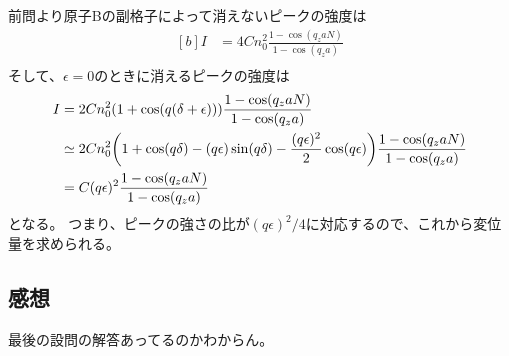 \documentclass[../../sp_2017.tex]{subfiles}
\begin{document}
\subsection{}
前問より原子Bの副格子によって消えないピークの強度は
\begin{equation}\begin{aligned}[b]
    I &=4Cn_0^2\frac{1-\cos(q_zaN)}{1-\cos(q_za)}\\
\end{aligned}\end{equation}
そして、\(\epsilon=0\)のときに消えるピークの強度は
\begin{equation}\begin{aligned}[b]
    I &=2Cn_0^2(1+\cos(q(\delta+\epsilon)))\frac{1-\cos(q_zaN)}{1-\cos(q_za)}\\
    &\simeq 2Cn_0^2\qty(1+\cos(q\delta)-(q\epsilon)\sin(q\delta)-\frac{(q\epsilon)^2}{2}\cos(q\epsilon))\frac{1-\cos(q_zaN)}{1-\cos(q_za)}\\
    &=C(q\epsilon)^2\frac{1-\cos(q_zaN)}{1-\cos(q_za)}
\end{aligned}\end{equation}
となる。
つまり、ピークの強さの比が\((q\epsilon)^2/4\)に対応するので、これから変位量を求められる。


\subsection*{感想}
最後の設問の解答あってるのかわからん。
\end{document}
